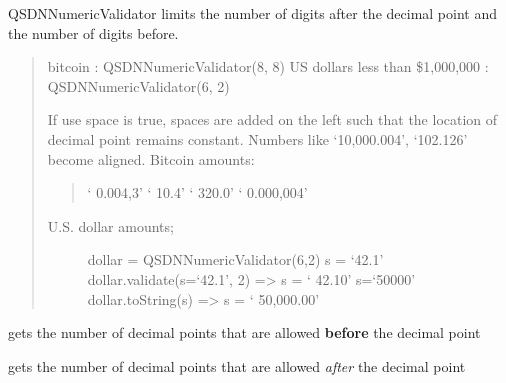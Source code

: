 \documentclass[letterpaper,10pt,english]{sphinxmanual}
\begin{document}
\begin{fulllineitems}
\label{index:qsdn.QSDNNumericValidator}
QSDNNumericValidator limits the number of digits after the decimal
point and the number of digits before.
\begin{quote}

bitcoin                         :  QSDNNumericValidator(8, 8)
US dollars less than \$1,000,000 :  QSDNNumericValidator(6, 2)

If use space is true, spaces are added on the left such that the location
of decimal point remains constant.  Numbers like `10,000.004', `102.126' become 
aligned.
Bitcoin amounts:
\begin{quote}

`        0.004,3'
`       10.4'
`      320.0'
`        0.000,004'
\end{quote}
\begin{description}
\item[{U.S. dollar amounts;  }] \leavevmode
dollar = QSDNNumericValidator(6,2)
s = `42.1'
dollar.validate(s=`42.1', 2)   =\textgreater{}  s = `     42.10'
s=`50000'
dollar.toString(s)              =\textgreater{} s = ` 50,000.00'

\end{description}
\end{quote}

\begin{fulllineitems}
\label{index:qsdn.QSDNNumericValidator.decamals}
gets the number of decimal points that are allowed \textbf{before} the decimal point

\end{fulllineitems}


\begin{fulllineitems}
\label{index:qsdn.QSDNNumericValidator.decimals}
gets the number of decimal points that are allowed \emph{after} the decimal point

\end{fulllineitems}



\end{fulllineitems}
\end{document}

